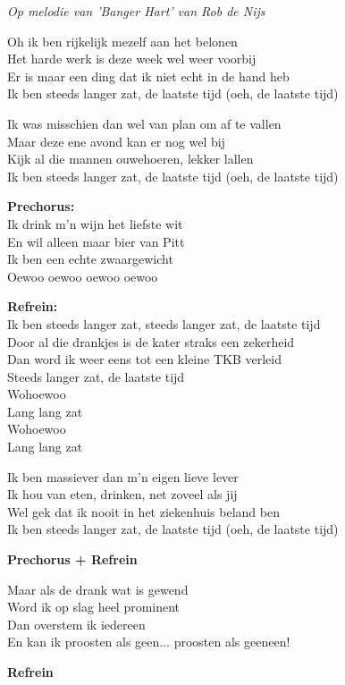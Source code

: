 \textit{Op melodie van 'Banger Hart' van Rob de Nijs}

Oh ik ben rijkelijk mezelf aan het belonen\\
Het harde werk is deze week wel weer voorbij\\
Er is maar een ding dat ik niet echt in de hand heb\\
Ik ben steeds langer zat, de laatste tijd (oeh, de laatste tijd)

Ik was misschien dan wel van plan om af te vallen\\
Maar deze ene avond kan er nog wel bij\\
Kijk al die mannen ouwehoeren, lekker lallen\\
Ik ben steeds langer zat, de laatste tijd (oeh, de laatste tijd)

\textbf{Prechorus:}\\
Ik drink m'n wijn het liefste wit\\
En wil alleen maar bier van Pitt\\
Ik ben een echte zwaargewicht\\
Oewoo oewoo oewoo oewoo

\textbf{Refrein:}\\
Ik ben steeds langer zat, steeds langer zat, de laatste tijd\\
Door al die drankjes is de kater straks een zekerheid\\
Dan word ik weer eens tot een kleine TKB verleid\\
Steeds langer zat, de laatste tijd\\
Wohoewoo\\
Lang lang zat\\
Wohoewoo\\
Lang lang zat

Ik ben massiever dan m'n eigen lieve lever\\
Ik hou van eten, drinken, net zoveel als jij\\
Wel gek dat ik nooit in het ziekenhuis beland ben\\
Ik ben steeds langer zat, de laatste tijd (oeh, de laatste tijd)

\textbf{Prechorus + Refrein}

Maar als de drank wat is gewend\\
Word ik op slag heel prominent\\
Dan overstem ik iedereen\\
En kan ik proosten als geen... proosten als geeneen!

\textbf{Refrein}